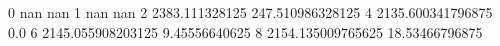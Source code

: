 0 nan nan
1 nan nan
2 2383.111328125 247.510986328125
4 2135.600341796875 0.0
6 2145.055908203125 9.45556640625
8 2154.135009765625 18.53466796875
